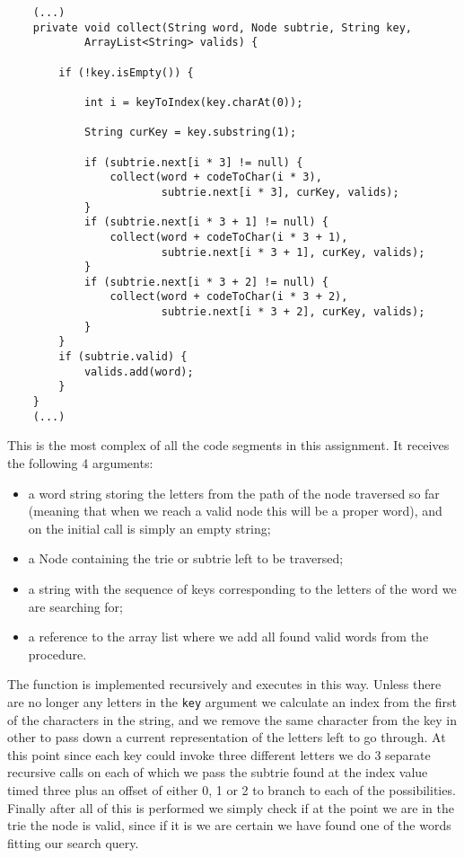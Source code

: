 \documentclass[a4paper,11pt]{article}
\begin{document}
\begin{verbatim}
    (...)
    private void collect(String word, Node subtrie, String key,
            ArrayList<String> valids) {

        if (!key.isEmpty()) {

            int i = keyToIndex(key.charAt(0));

            String curKey = key.substring(1);

            if (subtrie.next[i * 3] != null) {
                collect(word + codeToChar(i * 3),
                        subtrie.next[i * 3], curKey, valids);
            }
            if (subtrie.next[i * 3 + 1] != null) {
                collect(word + codeToChar(i * 3 + 1),
                        subtrie.next[i * 3 + 1], curKey, valids);
            }
            if (subtrie.next[i * 3 + 2] != null) {
                collect(word + codeToChar(i * 3 + 2), 
                        subtrie.next[i * 3 + 2], curKey, valids);
            }
        }
        if (subtrie.valid) {
            valids.add(word);
        }
    }
    (...)
\end{verbatim}

This is the most complex of all the code segments in this assignment. It receives the following 4 arguments:

\begin{itemize}
\item a word string storing the letters from the path of the node traversed so far (meaning that when we reach a valid node this will be a proper word), and on the initial call is simply an empty string;
\item a Node containing the trie or subtrie left to be traversed;
\item a string with the sequence of keys corresponding to the letters of the word we are searching for;
\item a reference to the array list where we add all found valid words from the procedure.
\end{itemize}

The function is implemented recursively and executes in this way. Unless there are no longer any letters in the {\tt key} argument we calculate an index from the first of the characters in the string, and we remove the same character from the key in other to pass down a current representation of the letters left to go through. At this point since each key could invoke three different letters we do 3 separate recursive calls on each of which we pass the subtrie found at the index value timed three plus an offset of either 0, 1 or 2 to branch to each of the possibilities. Finally after all of this is performed we simply check if at the point we are in the trie the node is valid, since if it is we are certain we have found one of the words fitting our search query.
\end{document}
